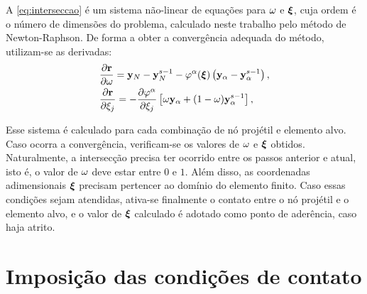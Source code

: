 \documentclass[Tese.tex]{subfiles}
\begin{document}
A \cref{eq:interseccao} é um sistema não-linear de equações para $\omega$ e $\boldsymbol{\xi}$, cuja ordem é o número de dimensões do problema, calculado neste trabalho pelo método de Newton-Raphson. De forma a obter a convergência adequada do método, utilizam-se as derivadas:
\begin{align}
& \dfrac{\partial \mathbf{r}}{\partial \omega} = \mathbf{y}_N - \mathbf{y}_N^{s-1} - \varphi^\alpha(\boldsymbol{\xi})\left(\mathbf{y}_\alpha -\mathbf{y}_\alpha^{s-1}\right),\\
& \dfrac{\partial \mathbf{r}}{\partial {\xi}_j} = -\dfrac{\partial \varphi^\alpha}{\partial {\xi}_j}\left[\omega\mathbf{y}_\alpha + (1-\omega)\mathbf{y}_\alpha^{s-1}\right],
\end{align}

Esse sistema é calculado para cada combinação de nó projétil e elemento alvo. Caso ocorra a convergência, verificam-se os valores de $\omega$ e $\boldsymbol{\xi}$ obtidos. Naturalmente, a intersecção precisa ter ocorrido entre os passos anterior e atual, isto é, o valor de $\omega$ deve estar entre $0$ e $1$. Além disso, as coordenadas adimensionais $\boldsymbol{\xi}$ precisam pertencer ao domínio do elemento finito. Caso essas condições sejam atendidas, ativa-se finalmente o contato entre o nó projétil e o elemento alvo, e o valor de $\boldsymbol{\xi}$ calculado é adotado como ponto de aderência, caso haja atrito.



\section{Imposição das condições de contato}
\end{document}
